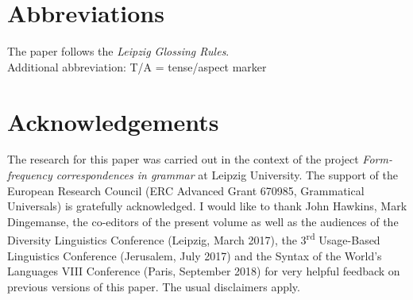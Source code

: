 \documentclass[output=paper]{langsci/langscibook}
\begin{document}
\section*{Abbreviations}

The paper follows the \textit{Leipzig Glossing Rules}.\\ Additional abbreviation: T/A = tense/aspect marker

\section*{Acknowledgements}

The research for this paper was carried out in the context of the project \textit{Form-frequency correspondences in grammar} at Leipzig University. The support of the European Research Council (ERC Advanced Grant 670985, Grammatical Universals) is gratefully acknowledged. I would like to thank John Hawkins, Mark Dingemanse, the co-editors of the present volume as well as the audiences of the Diversity Linguistics Conference (Leipzig,  {March 2017}), the 3\textsuperscript{rd} Usage-Based Linguistics Conference (Jerusalem,  {July 2017}) and the Syntax of the World’s Languages VIII Conference (Paris,  {September 2018}) for very helpful feedback on previous versions of this paper. The usual disclaimers apply.

\sloppy
\printbibliography[heading=subbibliography,notkeyword=this] 
\end{document}
